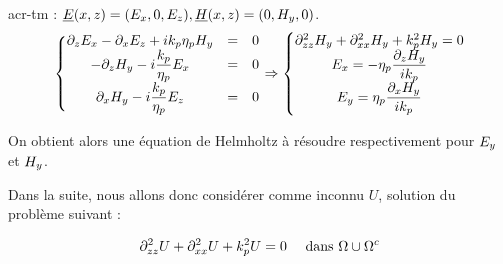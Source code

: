 \Gls{acr-tm} : $ \underline{E}({x},{z}) = (E_{x},0,E_{z}), \underline{H}({x},{z}) = (0,H_{y},0)$. 
\[
\left\lbrace 
\begin{matrix}
\partial_{{z}} E_{x} - \partial_{{x}} E_{z} + i k_p \eta_p  H_{y} &= & 0 \\
- \partial_{{z}} H_{y} - i\dfrac{k_p}{\eta_p} E_{x} & = & 0\\
\partial_{{x}} H_{y} -i\dfrac{k_p}{\eta_p} E_{z} &=&0\\
\end{matrix}
\right.
\Rightarrow
\left\lbrace
\begin{matrix}
\partial_{{z}{z}}^2 H_{y} + \partial_{{x}{x}}^2 H_{y} + k_p^2 H_{y} = 0\\
E_{x} = -\eta_p\dfrac{\partial_{{z}} H_{y}}{i k_p}\\
E_{y} = \eta_p\dfrac{\partial_{{x}} H_{y}}{i k_p}
\end{matrix}
\right.
\]

On obtient alors une équation de Helmholtz à résoudre respectivement pour $E_{y}$ et $H_{y}$.

Dans la suite, nous allons donc considérer comme inconnu $U$, solution du problème suivant : 

\begin{equation}
\partial_{{z}{z}}^2 U + \partial_{{x}{x}}^2 U + k_p^2 U = 0 \quad \text { dans $\Omega\cup\Omega^c$}
\end{equation}


% 
% 
% 

